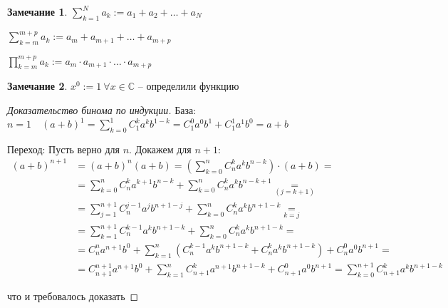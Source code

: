 \documentclass{book}
\renewcommand\C{\ensuremath{\mathbb{C}}}
\theoremstyle{definition}
\newtheorem*{note}{Замечание}
\begin{document}
       \begin{note}
           $\sum_{k=1}^{N} a_k := a_1 + a_2 + \ldots + a_N$

           $\sum_{k=m}^{m+p} a_k := a_m + a_{m+1} + \ldots + a_{m+p}$

           $\prod_{k=m}^{m+p} a_k := a_m\cdot a_{m+1}\cdot \ldots\cdot a_{m+p} $
        \end{note}
        \begin{note}
            $x^0:=1\ \forall x\in \C $ -- определили функцию
        \end{note}
        \begin{proof}
            [Доказательство бинома по индукции]
            База: $n=1\quad (a+b)^1 = \sum_{k=0}^{1} C_1^k a^kb^{1-k} = C_1^0 a^0b^1 + C_1^1a^1b^0 = a+b$

            Переход: Пусть верно для $n$. Докажем для $n+1$:
            \begin{equation*}
                \begin{split}
                (a+b)^{n+1} &= (a+b)^n(a+b) =
                \left(\sum_{k=0}^{n} C_n^k a^k b^{n-k}\right) \cdot  (a+b) =\\ &=\sum_{k=0}^{n} C_n^k a^{k+1}b^{n-k} + \sum_{k=0}^{n} C_n^ka^kb^{n-k+1} \underset{(j=k+1)} =\\
                &=\sum_{j=1}^{n+1} C_n^{j-1}a^jb^{n+1-j} + \sum_{k=0}^{n} C_n^k a^kb^{n+1-k} \underset{k=j}=\\
                &=\sum_{k=1}^{n+1} C_n^{k-1} a^k b^{n+1-k} + \sum_{k=0}^{n} C_n^ka^kb^{n+1-k}  =\\ 
                &=C_{n}^na^{n+1}b^0 + \sum_{k=1}^{n}\left( C_n^{k-1}a^kb^{n+1-k} + C_n^k a^kb^{n+1-k}\right) + C_n^0a^0b^{n+1}=\\ 
                &= C_{n+1}^{n+1}a^{n+1}b^0 + \sum_{k=1}^{n} C_{n+1}^k a^{n+1}b^{n+1-k} + C_{n+1}^0 a^0b^{n+1} = \sum_{k=0}^{n+1} C_{n+1}^ka^kb^{n+1-k}
               \end{split}
           \end{equation*}
           

           что и требовалось доказать
       \end{proof}
\end{document}
